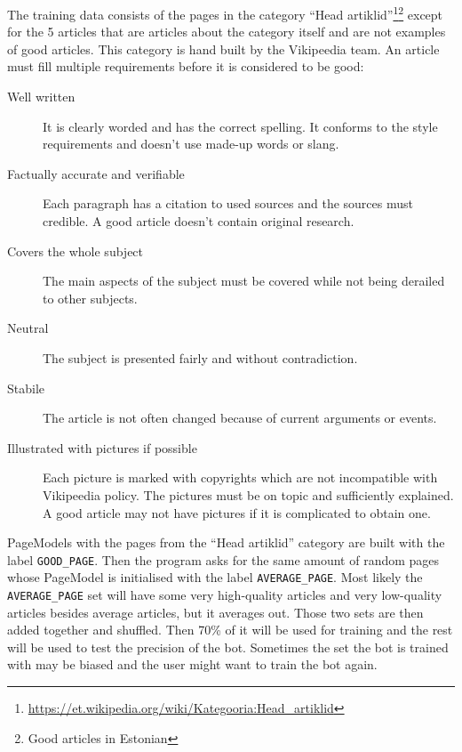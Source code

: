 The training data consists of the pages in the category ``Head
artiklid''\footnote{\url{https://et.wikipedia.org/wiki/Kategooria:Head_artiklid}}\footnote{Good
articles in Estonian} except for the 5 articles that are articles about the
category itself and are not examples of good articles. This category is hand
built by the Vikipeedia team. An article must fill multiple requirements before
it is considered to be good:\cite{wiki:good-article-requirements}
\begin{description}
  \item[Well written] It is clearly worded and has the correct
  spelling. It conforms to the style requirements and doesn't use made-up words
  or slang.
  \item[Factually accurate and verifiable] Each paragraph has a citation to used
  sources and the sources must credible. A good article doesn't contain original
  research.
  \item[Covers the whole subject] The main aspects of the subject must be
  covered while not being derailed to other subjects.
  \item[Neutral] The subject is presented fairly and without contradiction.
  \item[Stabile] The article is not often changed because of current
  arguments or events.
  \item[Illustrated with pictures if possible] Each picture is marked with
  copyrights which are not incompatible with Vikipeedia policy. The pictures
  must be on topic and sufficiently explained. A good article may not have
  pictures if it is complicated to obtain one.
\end{description}

PageModels with the pages from the ``Head artiklid'' category are built with the
label \verb;GOOD_PAGE;. Then the program asks for the same amount of random
pages whose PageModel is initialised with the label \verb;AVERAGE_PAGE;. Most
likely the \verb;AVERAGE_PAGE; set will have some very high-quality articles and
very low-quality articles besides average articles, but it averages out. Those
two sets are then added together and shuffled. Then 70\% of it will be used for
training and the rest will be used to test the precision of the bot. Sometimes
the set the bot is trained with may be biased and the user might want to train
the bot again.


